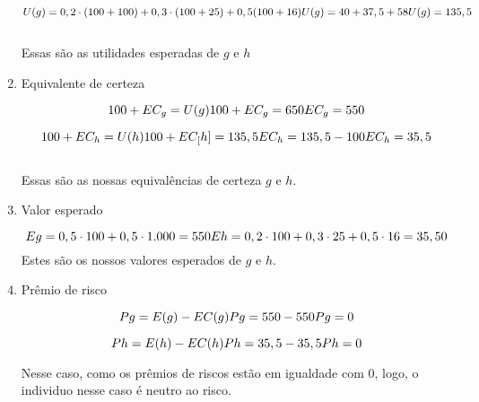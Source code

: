 \begin{flushleft}
\begin{enumerate}
	\begin{equation}
	U(g) = 0,2 \cdot (100 + 100) + 0,3 \cdot(100 + 25) + 0,5(100 + 16)
	$$\\$$
	U(g) = 40 + 37,5 + 58
	$$\\$$
	U(g) = 135,5
	\end{equation}
	\\ Essas são as utilidades esperadas de $g$ e $h$
	
	\item Equivalente de certeza
	
	\begin{equation}
	100 + EC_{g} = U(g)
	$$\\$$
	100 + EC_{g} = 650
	$$\\$$
	EC_{g} = 550
	\end{equation}
	
	\begin{equation}
	100 + EC_{h} = U(h)
	$$\\$$
	100 + EC_[h] = 135,5
	$$\\$$
	EC_{h} = 135,5 - 100
	$$\\$$
	EC_{h} = 35,5
	\end{equation}
	\\ Essas são as nossas equivalências de certeza $g$ e $h$.
	
	\item Valor esperado
	
	\begin{equation}
	Eg = 0,5 \cdot 100 + 0,5 \cdot 1.000 = 550
	$$\\$$
	Eh = 0,2 \cdot 100 + 0,3 \cdot 25 + 0,5 \cdot 16 = 35,50
	\end{equation}
	Estes são os nossos valores esperados de $g$ e $h$.
	
	\item Prêmio de risco
	
	\begin{equation}
	Pg = E(g) - EC(g)
	$$\\$$
	Pg = 550 - 550
	$$\\$$
	Pg = 0
	\end{equation}
	
	\begin{equation}
	Ph = E(h) - EC(h)
	$$\\$$
	Ph = 35,5 - 35,5
	$$\\$$
	Ph = 0
	\end{equation}
	
	Nesse caso, como os prêmios de riscos estão em igualdade com 0, logo, o individuo nesse caso é neutro ao risco.
\end{enumerate}


\end{flushleft}
